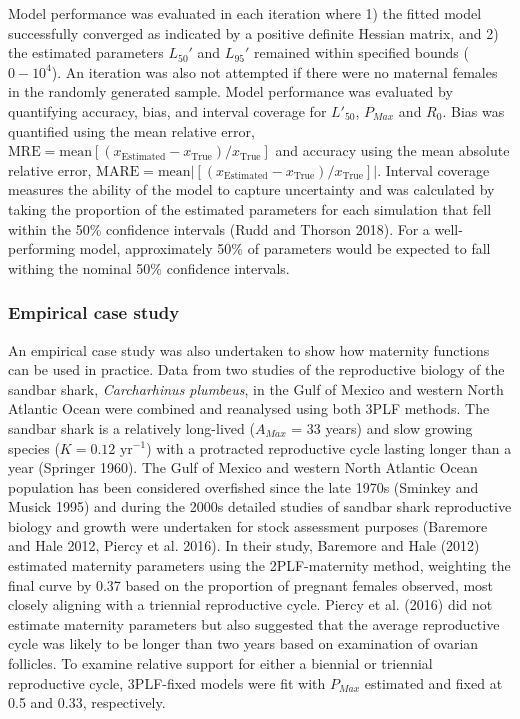 \documentclass[
]{article}
\begin{document}
Model performance was evaluated in each iteration where 1) the fitted model successfully converged as indicated by a positive definite Hessian matrix, and 2) the estimated parameters \(L_{50}'\) and \(L_{95}'\) remained within specified bounds (\(0 - 10^4\)). An iteration was also not attempted if there were no maternal females in the randomly generated sample. Model performance was evaluated by quantifying accuracy, bias, and interval coverage for \(L'_{50}\), \(P_{Max}\) and \(R_0\). Bias was quantified using the mean relative error, \(\text{MRE} = \text{mean}[(x_{\text{Estimated}} - x_{\text{True}})/x_{\text{True}}]\) and accuracy using the mean absolute relative error, \(\text{MARE} = \text{mean}|[(x_{\text{Estimated}} - x_{\text{True}})/x_{\text{True}}]|\). Interval coverage measures the ability of the model to capture uncertainty and was calculated by taking the proportion of the estimated parameters for each simulation that fell within the 50\% confidence intervals (Rudd and Thorson 2018). For a well-performing model, approximately 50\% of parameters would be expected to fall withing the nominal 50\% confidence intervals.

\subsubsection{Empirical case study}\label{empirical-case-study}

An empirical case study was also undertaken to show how maternity functions can be used in practice. Data from two studies of the reproductive biology of the sandbar shark, \emph{Carcharhinus plumbeus}, in the Gulf of Mexico and western North Atlantic Ocean were combined and reanalysed using both 3PLF methods. The sandbar shark is a relatively long-lived (\(A_{Max}\) = 33 years) and slow growing species (\(K = 0.12 \text{ yr}^{-1}\)) with a protracted reproductive cycle lasting longer than a year (Springer 1960). The Gulf of Mexico and western North Atlantic Ocean population has been considered overfished since the late 1970s (Sminkey and Musick 1995) and during the 2000s detailed studies of sandbar shark reproductive biology and growth were undertaken for stock assessment purposes (Baremore and Hale 2012, Piercy et al. 2016). In their study, Baremore and Hale (2012) estimated maternity parameters using the 2PLF-maternity method, weighting the final curve by 0.37 based on the proportion of pregnant females observed, most closely aligning with a triennial reproductive cycle. Piercy et al. (2016) did not estimate maternity parameters but also suggested that the average reproductive cycle was likely to be longer than two years based on examination of ovarian follicles. To examine relative support for either a biennial or triennial reproductive cycle, 3PLF-fixed models were fit with \(P_{Max}\) estimated and fixed at 0.5 and 0.33, respectively.
\end{document}
